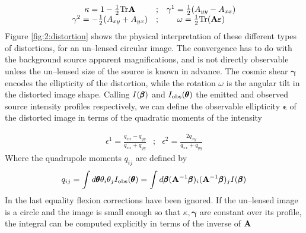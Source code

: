 \begin{equation}
\label{eq:2:dfl-inverse}
\begin{matrix}
\kappa = 1-\frac{1}{2}{\rm Tr} \mathbf{A} & ; & \gamma^1 = \frac{1}{2}(A_{yy} - A_{xx}) \\
\gamma^2 = -\frac{1}{2}(A_{xy}+A_{yx}) & ; & \omega = \frac{1}{2}{\rm Tr} (\mathbf{A}\pmb{\varepsilon})
\end{matrix}
\end{equation}
% 
Figure \ref{fig:2:distortion} shows the physical interpretation of these different types of distortions, for an un--lensed circular image. The convergence has to do with the background source apparent magnifications, and is not directly observable unless the un--lensed size of the source is known in advance. The cosmic shear $\pmb{\gamma}$ encodes the ellipticity of the distortion, while the rotation $\omega$ is the angular tilt in the distorted image shape. Calling $I(\pmb{\beta})$ and $I_{\rm obs}(\pmb{\theta})$ the emitted and observed source intensity profiles respectively, we can define the observable ellipticity $\pmb{\epsilon}$ of the distorted image in terms of the quadratic moments of the intensity 

\begin{equation}
\label{eq:2:ellipticity-1}
\begin{matrix}
\epsilon^1 = \frac{q_{xx}-q_{yy}}{q_{xx}+q_{yy}} & ; & \epsilon^2 = \frac{2q_{xy}}{q_{xx}+q_{yy}}
\end{matrix}
\end{equation} 
%
Where the quadrupole moments $q_{ij}$ are defined by 
\begin{equation}
\label{eq:2:quadrupole}
q_{ij} = \int d\pmb{\theta} \theta_i\theta_j I_{\rm obs}(\pmb{\theta}) = \int d\pmb{\beta} (\mathbf{A}^{-1}\pmb{\beta})_i(\mathbf{A}^{-1}\pmb{\beta})_j I(\pmb{\beta})
\end{equation}
%
In the last equality flexion corrections have been ignored. If the un--lensed image is a circle and the image is small enough so that $\kappa,\pmb{\gamma}$ are constant over its profile, the integral can be computed explicitly in terms of the inverse of $\mathbf{A}$

